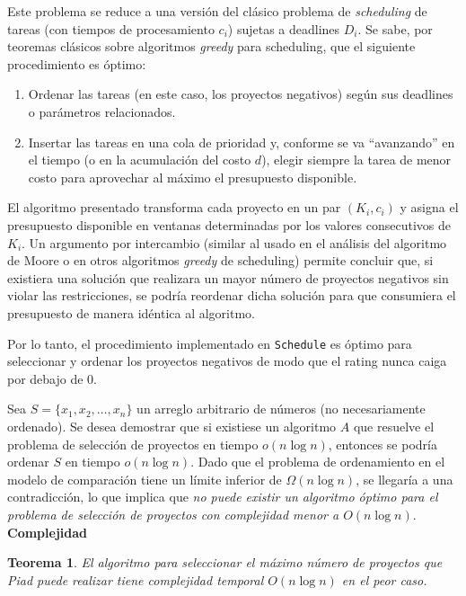 ﻿\documentclass{article}
\theoremstyle{plain}
\newtheorem{theorem}{Teorema}
\theoremstyle{definition}
\begin{document}
Este problema se reduce a una versión del clásico problema de \emph{scheduling} de tareas (con tiempos de procesamiento $c_i$) sujetas a deadlines $D_i$. Se sabe, por teoremas clásicos sobre algoritmos \emph{greedy} para scheduling, que el siguiente procedimiento es óptimo:
\begin{enumerate}[label=\alph*)]
    \item Ordenar las tareas (en este caso, los proyectos negativos) según sus deadlines o parámetros relacionados.
    \item Insertar las tareas en una cola de prioridad y, conforme se va ``avanzando'' en el tiempo (o en la acumulación del costo $d$), elegir siempre la tarea de menor costo para aprovechar al máximo el presupuesto disponible.
\end{enumerate}
El algoritmo presentado transforma cada proyecto en un par $(K_i, c_i)$ y asigna el presupuesto disponible en ventanas determinadas por los valores consecutivos de $K_i$. Un argumento por intercambio (similar al usado en el análisis del algoritmo de Moore o en otros algoritmos \emph{greedy} de scheduling) permite concluir que, si existiera una solución que realizara un mayor número de proyectos negativos sin violar las restricciones, se podría reordenar dicha solución para que consumiera el presupuesto de manera idéntica al algoritmo.

Por lo tanto, el procedimiento implementado en \texttt{Schedule} es óptimo para seleccionar y ordenar los proyectos negativos de modo que el rating nunca caiga por debajo de 0.

Sea \(S=\{x_1,x_2,\dots,x_n\}\) un arreglo arbitrario de números (no necesariamente ordenado). Se desea demostrar que si existiese un algoritmo \(A\) que resuelve el problema de selección de proyectos en tiempo \(o(n\log n)\), entonces se podría ordenar \(S\) en tiempo \(o(n\log n)\). Dado que el problema de ordenamiento en el modelo de comparación tiene un límite inferior de \(\Omega(n\log n)\), se llegaría a una contradicción, lo que implica que \emph{no puede existir un algoritmo óptimo para el problema de selección de proyectos con complejidad menor a \(O(n\log n)\)}.
\\

\textbf{Complejidad}

\begin{theorem}
El algoritmo para seleccionar el máximo número de proyectos que Piad puede realizar tiene complejidad temporal \(O(n \log n)\) en el peor caso.
\end{theorem}
\end{document}
